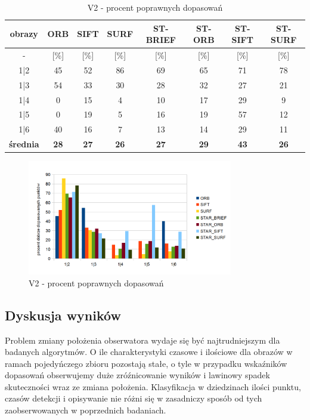 \begin{table}[htbp]
  \centering
  \caption{V2 - procent poprawnych dopasowań}
    \begin{tabular}{|c|c|c|c|c|c|c|c|}\hline
    obrazy & \textbf{ORB} & \textbf{SIFT} & \textbf{SURF} & \textbf{ST-BRIEF} & \textbf{ST-ORB} & \textbf{ST-SIFT} & \textbf{ST-SURF} \\\hline
     - & [\%] & [\%] & [\%] & [\%] & [\%] & [\%] & [\%] \\\hline
    1|2 & 45 & 52 & 86 & 69 & 65 & 71 & 78 \\
    1|3 & 54 & 33 & 30 & 28 & 32 & 27 & 21 \\
    1|4 & 0 & 15 & 4 & 10 & 17 & 29 & 9 \\
    1|5 & 0 & 19 & 5 & 16 & 19 & 57 & 12 \\
    1|6 & 40 & 16 & 7 & 13 & 14 & 29 & 11 \\\hline
    \textbf{średnia} & \textbf{28} & \textbf{27} & \textbf{26} & \textbf{27} & \textbf{29} & \textbf{43} & \textbf{26} \\\hline
    
    \end{tabular}%
  \label{tab:v2_m2}%
\end{table}%


\begin{figure}
\centering
\includegraphics[width=0.8\textwidth]{pict/slowik/v2/m2.png}
\caption{V2 - procent poprawnych dopasowań}
\label{fig:v2_m2}
\end{figure}



\subsection{Dyskusja wyników}
Problem zmiany położenia obserwatora wydaje się być najtrudniejszym dla badanych algorytmów. O ile charakterystyki czasowe i ilościowe dla obrazów w ramach pojedyńczego zbioru pozostają stałe, o tyle w przypadku wskaźników dopasowań obserwujemy duże zróźnicowanie wyników i lawinowy spadek skuteczności wraz ze zmiana położenia. Klasyfikacja w dziedzinach ilości punktu, czasów detekcji i opisywanie nie różni się w zasadniczy sposób od tych zaobserwowanych w poprzednich badaniach.

